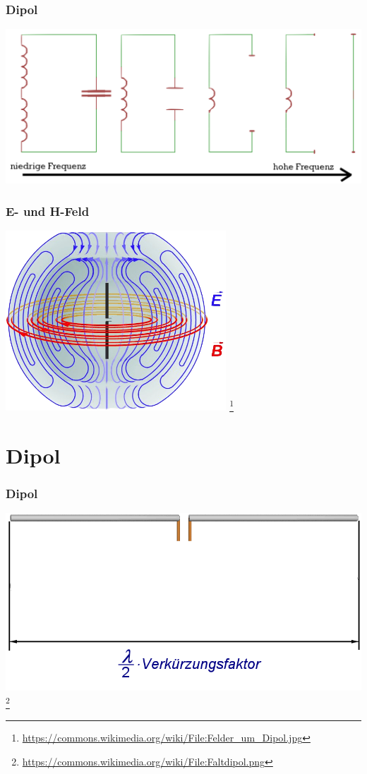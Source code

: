 \begin{frame}
    \frametitle{Dipol}
    \begin{center}
        \includegraphics[width=1\textwidth]{e11/dipol_entstehung.png}
	\end{center}
\end{frame}

\begin{frame}
    \frametitle{E- und H-Feld}
    \begin{center}
        \includegraphics[width=0.62\textwidth]{e11/Felder_um_Dipol.png}
        \footnote{\tiny \url{https://commons.wikimedia.org/wiki/File:Felder_um_Dipol.jpg}}
	\end{center}
\end{frame}


\section*{Dipol}

\begin{frame}
    \frametitle{Dipol}
    \begin{center}
        \includegraphics[width=1\textwidth]{e11/Faltdipol.png}
        \footnote{\tiny \url{https://commons.wikimedia.org/wiki/File:Faltdipol.png}}
	\end{center}
\end{frame}


